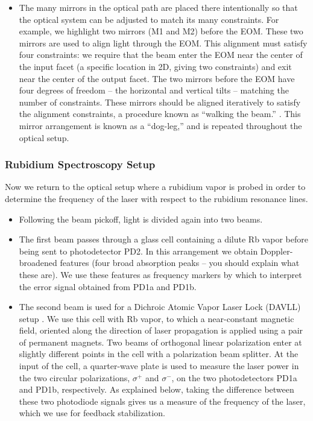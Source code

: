 \documentclass{../lab}
\begin{document}
\begin{itemize}
    \item The many mirrors in the optical path are placed there intentionally so that the optical system can be adjusted to match its many constraints. For example, we highlight two mirrors (M1 and M2) before the EOM. These two mirrors are used to align light through the EOM. This alignment must satisfy four constraints: we require that the beam enter the EOM near the center of the input facet (a specific location in 2D, giving two constraints) and exit near the center of the output facet. The two mirrors before the EOM have four degrees of freedom – the horizontal and vertical tilts – matching the number of constraints. These mirrors should be aligned iteratively to satisfy the alignment constraints, a procedure known as ``walking the beam.'' \cite{SUNYStonyBrook}. This mirror arrangement is known as a ``dog-leg,'' and is repeated throughout the optical setup.
\end{itemize}

\subsubsection{Rubidium Spectroscopy Setup}

Now we return to the optical setup where a rubidium vapor is probed in order to determine the frequency of the laser with respect to the rubidium resonance lines.

\begin{itemize}
    \item Following the beam pickoff, light is divided again into two beams.

    \item The first beam passes through a glass cell containing a dilute Rb vapor before being sent to photodetector PD2. In this arrangement we obtain Doppler-broadened features (four broad absorption peaks -- you should explain what these are). We use these features as frequency markers by which to interpret the error signal obtained from PD1a and PD1b.

    \item The second beam is used for a Dichroic Atomic Vapor Laser Lock (DAVLL) setup \cite{Corwin}. We use this cell with Rb vapor, to which a near-constant magnetic field, oriented along the direction of laser propagation is applied using a pair of permanent magnets. Two beams of orthogonal linear polarization enter at slightly different points in the cell with a polarization beam splitter. At the input of the cell, a quarter-wave plate is used to measure the laser power in the two circular polarizations, $\sigma^+$ and $\sigma^-$, on the two photodetectors PD1a and PD1b, respectively. As explained below, taking the difference between these two photodiode signals gives us a measure of the frequency of the laser, which we use for feedback stabilization.
\end{itemize}
\end{document}
